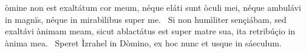 \psalmChapterWithInscription{}
{ }
{%
òmine non est exaltátum cor meum, néque eláti sunt òculi mei, néque ambulávi in magnïs, néque in mirabìlibus super me. 
~Si non humìliter sençiábam, sed exaltávi ànimam meam, sicut ablactátus est super matre sua, ita retribúçio in ànima mea. 
~Speret Ìzrahel in Dòmino, ex hoc nunc et usque in sáeculum. 
}
